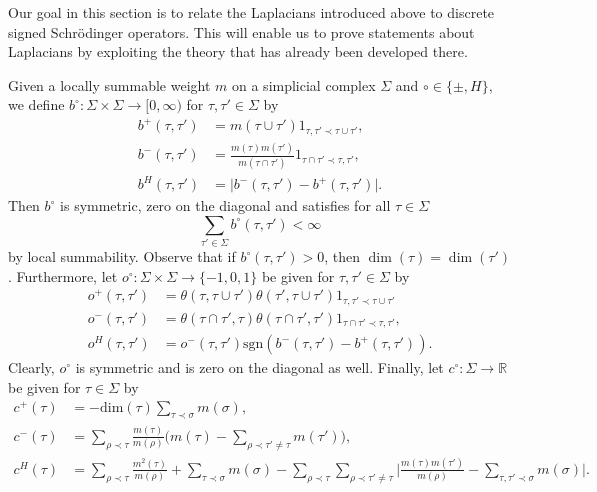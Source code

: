 \documentclass[10pt]{amsart}
\theoremstyle{definition}
\renewcommand{\bullet}{{\circ}}
\begin{document}
Our goal in this section is to relate the Laplacians introduced above to discrete signed Schrö\-dinger operators. This will enable us to prove statements about Laplacians by exploiting the theory that has already been developed there. 




Given a locally summable weight $m$ on a simplicial complex $\Sigma$ and $\bullet\in\{\pm,H\}$, we define $b^{\bullet}:\Sigma\times\Sigma\to[0,\infty)$ for $\tau,\tau'\in \Sigma$ by
   \begin{align*}
	b^+(\tau,\tau') &= m(\tau\cup\tau')1_{\tau,\tau'\prec\tau\cup\tau'},\\
	b^-(\tau,\tau') &= \frac{m(\tau)m(\tau')}{m(\tau\cap\tau')}1_{\tau\cap\tau'\prec\tau,\tau'},\\
	b^H(\tau,\tau') & = \vert b^-(\tau,\tau')-b^+(\tau,\tau')\vert.
\end{align*}
Then $b^{\bullet}$ is symmetric, zero on the diagonal and satisfies for all $\tau\in\Sigma$
\begin{equation*}
	\sum_{\tau'\in \Sigma}b^{\bullet}(\tau,\tau')<\infty
\end{equation*}
by local summability. Observe that if $b^{\bullet}(\tau,\tau')>0$, then $\dim(\tau)=\dim(\tau')$.
Furthermore, let $o^{\bullet}:\Sigma\times\Sigma\to\{-1,0,1\}$ be  given for $\tau,\tau'\in \Sigma$ by
\begin{align*}
	o^+(\tau,\tau') &= \theta(\tau,\tau\cup\tau')\theta(\tau',\tau\cup\tau') 1_{\tau,\tau'\prec\tau\cup\tau'}\\
	o^-(\tau,\tau') &= \theta(\tau\cap\tau',\tau)\theta(\tau\cap\tau',\tau')1_{\tau\cap\tau'\prec\tau,\tau'},\\
	o^H(\tau,\tau') &= o^-(\tau,\tau')\mathrm{sgn}(b^-(\tau,\tau')-b^+(\tau,\tau')).
\end{align*}
Clearly, $o^{\bullet}$ is symmetric and is zero on the diagonal as well. 
Finally, let $c^{\bullet}:\Sigma\to\mathbb{R}$ be given for $\tau\in \Sigma$ by
\begin{align*}
	c^+(\tau) &= -\mathrm{dim}(\tau)\sum_{\tau\prec\sigma}m(\sigma),\\
	c^-(\tau) &= \sum_{\rho\prec\tau}\frac{m(\tau)}{m(\rho)}\Big(m(\tau)-\sum_{\rho\prec\tau'\neq\tau}m(\tau')\Big),\\
	c^H(\tau) &= \sum_{\rho\prec\tau}\frac{m^2(\tau)}{m(\rho)}+\sum_{\tau\prec\sigma}m(\sigma)-\sum_{\rho\prec\tau}\sum_{\rho\prec\tau'\neq\tau}\Big\vert\frac{m(\tau)m(\tau')}{m(\rho)}-\sum_{\tau,\tau'\prec\sigma}m(\sigma)\Big\vert.
\end{align*}
\end{document}
